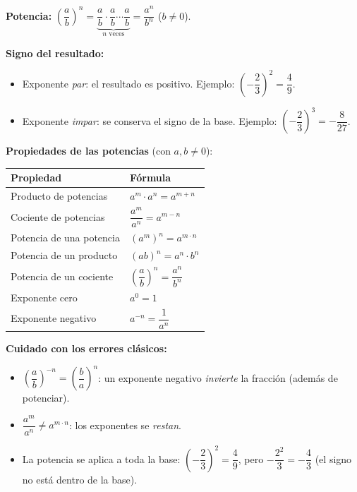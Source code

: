 \documentclass[12pt, letterpaper]{article}
\begin{document}
\begin{cuadroteoria}
  \textbf{Potencia:} $\left(\dfrac{a}{b}\right)^n = \underbrace{\dfrac{a}{b} \cdot \dfrac{a}{b} \cdots \dfrac{a}{b}}_{n \text{ veces}} = \dfrac{a^n}{b^n}$ \quad ($b \neq 0$).

  \textbf{Signo del resultado:}
  \begin{itemize}[leftmargin=*]
    \item Exponente \emph{par}: el resultado es positivo. Ejemplo: $\left(-\dfrac{2}{3}\right)^2 = \dfrac{4}{9}$.
    \item Exponente \emph{impar}: se conserva el signo de la base. Ejemplo: $\left(-\dfrac{2}{3}\right)^3 = -\dfrac{8}{27}$.
  \end{itemize}

  \textbf{Propiedades de las potencias} (con $a, b \neq 0$):
  \begin{center}
    \begin{tabular}{ll}
      \toprule
      \textbf{Propiedad}       & \textbf{Fórmula}                                 \\
      \midrule
      Producto de potencias    & $a^m \cdot a^n = a^{m+n}$                        \\
      Cociente de potencias    & $\dfrac{a^m}{a^n} = a^{m-n}$                     \\
      Potencia de una potencia & $(a^m)^n = a^{m \cdot n}$                        \\
      Potencia de un producto  & $(ab)^n = a^n \cdot b^n$                         \\
      Potencia de un cociente  & $\left(\dfrac{a}{b}\right)^n = \dfrac{a^n}{b^n}$ \\
      Exponente cero           & $a^0 = 1$                                        \\
      Exponente negativo       & $a^{-n} = \dfrac{1}{a^n}$                        \\
      \bottomrule
    \end{tabular}
  \end{center}
\end{cuadroteoria}
\newpage
\begin{cuadroadvertencia}
  \textbf{Cuidado con los errores clásicos:}
  \begin{itemize}[leftmargin=*]
    \item $\left(\dfrac{a}{b}\right)^{-n} = \left(\dfrac{b}{a}\right)^{n}$: un exponente negativo \emph{invierte} la fracción (además de potenciar).
    \item $\dfrac{a^m}{a^n} \neq a^{m \cdot n}$: los exponentes se \emph{restan}.
    \item La potencia se aplica a toda la base: $\left(-\dfrac{2}{3}\right)^2 = \dfrac{4}{9}$, pero $-\dfrac{2^2}{3} = -\dfrac{4}{3}$ (el signo no está dentro de la base).
  \end{itemize}
\end{cuadroadvertencia}
\end{document}
